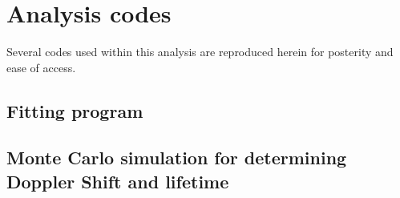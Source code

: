 %
%
%
%
%
%
%
%

%
%

\chapter{Analysis codes}
\label{appendix: codes}

Several codes used within this analysis are reproduced herein for posterity and ease of access.


\section{Fitting program}



\section{Monte Carlo simulation for determining Doppler Shift and lifetime}



%
% 
% 
